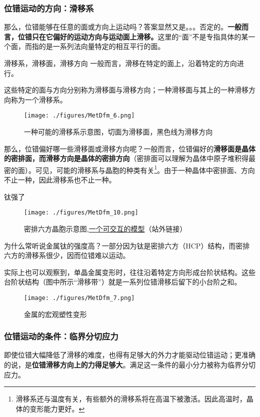 \subsubsection{位错运动的方向：滑移系}
那么，位错能够在任意的面或方向上运动吗？答案显然又是。。。否定的。\textbf{一般而言，位错只在它偏好的运动方向与运动面上滑移。}这里的“面”不是专指具体的某一个面，而指的是一系列法向量特定的相互平行的面。

\begin{theorem}{滑移系，滑移面，滑移方向}
一般而言，滑移在特定的面上，沿着特定的方向进行。

这些特定的面与方向分别称为滑移面与滑移方向；一种滑移面与其上的一种滑移方向称为一个滑移系。

\end{theorem}
\begin{figure}[ht]
\centering
\texttt{[image: ./figures/MetDfm\_6.png]}
\caption{一种可能的滑移系示意图，切面为滑移面，黑色线为滑移方向} \label{MetDfm_fig6}
\end{figure}

那么，位错偏好哪一些滑移面或滑移方向呢？一般而言，位错偏好的\textbf{滑移面是晶体的密排面，而滑移方向是晶体的密排方向}（密排面可以理解为晶体中原子堆积得最密的面）。可见，可能的滑移系与晶胞的种类有关\footnote{滑移系还与温度有关，有些额外的滑移系将在高温下被激活。因此高温时，晶体的变形能力更好。}。由于一种晶体中密排面、方向不止一种，因此滑移系也不止一种。

\begin{example}{钛强了}
\begin{figure}[ht]
\centering
\texttt{[image: ./figures/MetDfm\_10.png]}
\caption{密排六方晶胞示意图,\href{https://www.geogebra.org/m/xrzejabt}{一个可交互的模型}（站外链接）} \label{MetDfm_fig10}
\end{figure}
为什么常听说金属钛的强度高？一部分因为钛是密排六方（HCP）结构，而密排六方的滑移系很少，因而位错难以运动。
\end{example}

实际上也可以观察到，单晶金属变形时，往往沿着特定方向形成台阶状结构。这些台阶状结构（图中所示“滑移带”）就是一系列位错滑移后留下的小台阶之和。
\begin{figure}[ht]
\centering
\texttt{[image: ./figures/MetDfm\_7.png]}
\caption{金属的宏观塑性变形} \label{MetDfm_fig7}
\end{figure}

\subsubsection{位错运动的条件：临界分切应力}
即使位错大幅降低了滑移的难度，也得有足够大的外力才能驱动位错运动；更准确的说，是\textbf{位错滑移方向上的力得足够大}。满足这一条件的最小分力被称为临界分切应力。

